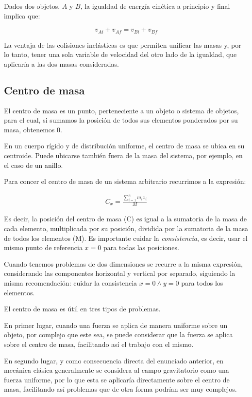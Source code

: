\documentclass[12pt]{article}
\begin{document}
Dados dos objetos, \(A\) y \(B\),
la igualdad de energía cinética a principio y final implica que:

\begin{equation}
	v_{Ai} + v_{Af} = v_{Bi} + v_{Bf}
\end{equation}

La ventaja de las colisiones inelásticas es que permiten unificar las masas y,
por lo tanto, tener una sola variable de velocidad del otro lado de la igualdad,
que aplicaría a las dos masas consideradas.

\subsection{Centro de masa}

El centro de masa es un punto,
perteneciente a un objeto o sistema de objetos,
para el cual,
si sumamos la posición de todos sus elementos ponderados por su masa,
obtenemos 0.

En un cuerpo rígido y de distribución uniforme,
el centro de masa se ubica en su centroide.
Puede ubicarse también fuera de la masa del sistema,
por ejemplo,
en el caso de un anillo.

Para concer el centro de masa de un sistema arbitrario recurrimos a la expresión:

\begin{align*}
	C_{x} = \frac{\sum_{i=1}^{n}m_{i}x_{i}}{M}
\end{align*}

Es decir,
la posición del centro de masa (C)
es igual a la sumatoria de la masa de cada elemento,
multiplicada por su posición,
dividida por la sumatoria de la masa de todos los elementos (M).
Es importante cuidar la \textit{consistencia},
es decir,
usar el mismo punto de referencia \(x=0\) para todas las posiciones.

Cuando tenemos problemas de dos dimensiones se recurre a la misma expresión,
considerando las componentes horizontal y vertical por separado,
siguiendo la misma recomendación:
cuidar la consistencia \(x=0 \land y=0\) para todos los elementos.

El centro de masa es útil en tres tipos de problemas.

En primer lugar,
cuando una fuerza se aplica de manera uniforme sobre un objeto,
por complejo que este sea,
se puede considerar que la fuerza se aplica sobre el centro de masa,
facilitando así el trabajo con el mismo.

En segundo lugar,
y como consecuencia directa del enunciado anterior,
en mecánica clásica generalmente se considera al campo gravitatorio como una fuerza uniforme,
por lo que esta se aplicaría directamente sobre el centro de masa,
facilitando así problemas que de otra forma podrían ser muy complejos.
\end{document}
